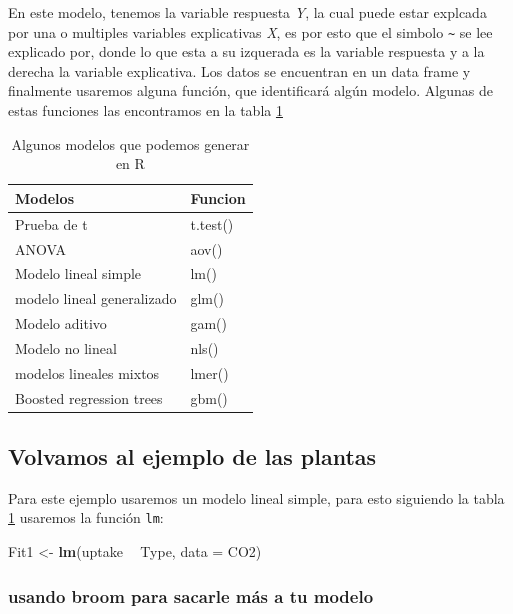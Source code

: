 \documentclass[]{book}
\newenvironment{Shaded}{\begin{snugshade}}{\end{snugshade}}
\newcommand{\DataTypeTok}[1]{\textcolor[rgb]{0.13,0.29,0.53}{#1}}
\newcommand{\KeywordTok}[1]{\textcolor[rgb]{0.13,0.29,0.53}{\textbf{#1}}}
\newcommand{\NormalTok}[1]{#1}
\newcommand{\OperatorTok}[1]{\textcolor[rgb]{0.81,0.36,0.00}{\textbf{#1}}}
\newcommand{\StringTok}[1]{\textcolor[rgb]{0.31,0.60,0.02}{#1}}
\begin{document}
En este modelo, tenemos la variable respuesta \emph{Y}, la cual puede
estar explcada por una o multiples variables explicativas \emph{X}, es
por esto que el simbolo \texttt{\textasciitilde{}} se lee explicado por,
donde lo que esta a su izquerada es la variable respuesta y a la derecha
la variable explicativa. Los datos se encuentran en un data frame y
finalmente usaremos alguna función, que identificará algún modelo.
Algunas de estas funciones las encontramos en la tabla \ref{tab:Modelos}

\begin{table}

\caption{\label{tab:Modelos}Algunos modelos que podemos generar en R}
\centering
\begin{tabular}[t]{ll}
\toprule
Modelos & Funcion\\
\midrule
Prueba de t & t.test()\\
ANOVA & aov()\\
Modelo lineal simple & lm()\\
modelo lineal generalizado & glm()\\
Modelo aditivo & gam()\\
\addlinespace
Modelo no lineal & nls()\\
modelos lineales mixtos & lmer()\\
Boosted regression trees & gbm()\\
\bottomrule
\end{tabular}
\end{table}

\hypertarget{volvamos-al-ejemplo-de-las-plantas}{%
\subsection{Volvamos al ejemplo de las
plantas}\label{volvamos-al-ejemplo-de-las-plantas}}

Para este ejemplo usaremos un modelo lineal simple, para esto siguiendo
la tabla \ref{tab:Modelos} usaremos la función \texttt{lm}:

\begin{Shaded}
\begin{Highlighting}[]
\NormalTok{Fit1 <-}\StringTok{ }\KeywordTok{lm}\NormalTok{(uptake }\OperatorTok{~}\StringTok{ }\NormalTok{Type, }\DataTypeTok{data =}\NormalTok{ CO2)}
\end{Highlighting}
\end{Shaded}

\hypertarget{usando-broom-para-sacarle-mas-a-tu-modelo}{%
\subsubsection{usando broom para sacarle más a tu
modelo}\label{usando-broom-para-sacarle-mas-a-tu-modelo}}
\end{document}
